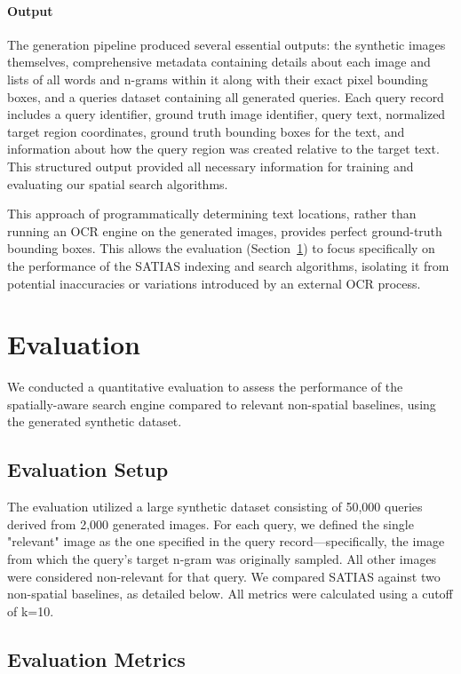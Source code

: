 \documentclass[manuscript,screen]{acmart}
\begin{document}
\paragraph{Output} The generation pipeline produced several essential outputs: the synthetic images themselves, comprehensive metadata containing details about each image and lists of all words and n-grams within it along with their exact pixel bounding boxes, and a queries dataset containing all generated queries. Each query record includes a query identifier, ground truth image identifier, query text, normalized target region coordinates, ground truth bounding boxes for the text, and information about how the query region was created relative to the target text. This structured output provided all necessary information for training and evaluating our spatial search algorithms.

This approach of programmatically determining text locations, rather than running an OCR engine on the generated images, provides perfect ground-truth bounding boxes. This allows the evaluation (Section~\ref{sec:evaluation}) to focus specifically on the performance of the SATIAS indexing and search algorithms, isolating it from potential inaccuracies or variations introduced by an external OCR process.

\section{Evaluation}
\label{sec:evaluation}

We conducted a quantitative evaluation to assess the performance of the spatially-aware search engine compared to relevant non-spatial baselines, using the generated synthetic dataset.

\subsection{Evaluation Setup}

The evaluation utilized a large synthetic dataset consisting of 50,000 queries derived from 2,000 generated images. For each query, we defined the single "relevant" image as the one specified in the query record—specifically, the image from which the query's target n-gram was originally sampled. All other images were considered non-relevant for that query. We compared SATIAS against two non-spatial baselines, as detailed below. All metrics were calculated using a cutoff of k=10.

\subsection{Evaluation Metrics}
\label{sec:evaluation_metrics}
\end{document}
